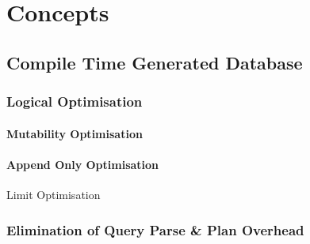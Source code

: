 \chapter{Concepts}

\section{Compile Time Generated Database}

\subsection{Logical Optimisation} 

\subsubsection{Mutability Optimisation}



\subsubsection{Append Only Optimisation}

\begin{futurebox}{Limit Optimisation}
\end{futurebox}

\subsection{Elimination of Query Parse \& Plan Overhead}


